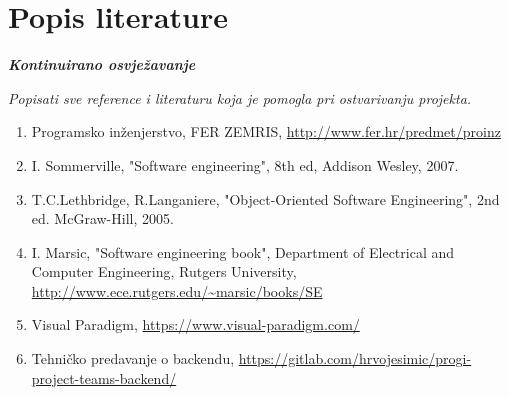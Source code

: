 \chapter*{Popis literature}
	 	
 		\textbf{\textit{Kontinuirano osvježavanje}}
	
		\textit{Popisati sve reference i literaturu koja je pomogla pri ostvarivanju projekta.}
		
		
		\begin{enumerate}
			
			
			\item  Programsko inženjerstvo, FER ZEMRIS, \url{http://www.fer.hr/predmet/proinz}
			
			\item  I. Sommerville, "Software engineering", 8th ed, Addison Wesley, 2007.
			
			\item  T.C.Lethbridge, R.Langaniere, "Object-Oriented Software Engineering", 2nd ed. McGraw-Hill, 2005.
			
			\item  I. Marsic, "Software engineering book", Department of Electrical and Computer Engineering, Rutgers University, \url{http://www.ece.rutgers.edu/~marsic/books/SE}
			
			\item  Visual Paradigm, \url{https://www.visual-paradigm.com/}
			
			\item  Tehničko predavanje o backendu, \url{https://gitlab.com/hrvojesimic/progi-project-teams-backend/}

		\end{enumerate}
		
		 